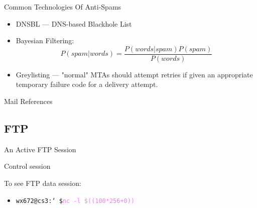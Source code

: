 
\begin{frame}{Common Technologies Of Anti-Spams}
  \begin{itemize}
  \item DNSBL --- DNS-based Blackhole List
  \item Bayesian Filtering: $$P(spam|words) = \frac{P(words|spam)P(spam)}{P(words)}$$
  \item Greylisting --- "normal" MTAs should attempt retries if given an appropriate
    temporary failure code for a delivery attempt.
  \end{itemize}
\end{frame}

\begin{frame}[allowframebreaks]{Mail References}
  \begin{refsection}
    \nocite{wiki:smtp, wiki:pop, wiki:imap, wiki:mime, rfc2821, rfc1939,
      rfc3501, rfc2045}
    \printbibliography[heading=none]
  \end{refsection}
\end{frame}

\subsection{FTP}
  
\begin{frame}{}
  \begin{center}
  \end{center} \label{fig:model}
\end{frame}

\begin{frame}{An Active FTP Session}
  \begin{block}{Control session}
    \begin{center}
    \end{center}
  \end{block}
  \begin{block}{To see FTP data session:}
    \begin{itemize}
    \item[] \texttt{wx672@cs3:\char`~\$}\quad\textcolor{violet}{\texttt{nc -l \$((100*256+0))}}
    \end{itemize}
  \end{block}
\end{frame}

